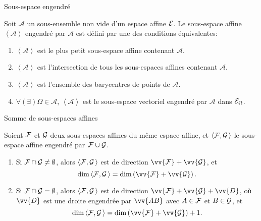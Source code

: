 \documentclass[
bigger]{m53beamer}
\begin{document}
  \begin{frame}{Sous-espace engendré}
    \begin{defprop}
      Soit $\mathcal{A}$ un sous-ensemble non vide d'un espace affine $\mathcal{E}$. Le sous-espace affine $\left<\mathcal{A}\right>$ engendré par $\mathcal{A}$ est défini par une des conditions équivalentes:
        \begin{enumerate}[<+(1)->]
          \item $\left<\mathcal{A}\right>$ est le plus petit sous-espace affine contenant $\mathcal{A}$.
          \item $\left<\mathcal{A}\right>$ est l'intersection de tous les sous-espaces affines contenant $\mathcal{A}$.
          \item $\left<\mathcal{A}\right>$ est l'ensemble des barycentres de points de $\mathcal{A}$.
          \item $\forall(\exists) \Omega \in \mathcal{A}$, $\left<\mathcal{A}\right>$ est le sous-espace vectoriel engendré par $\mathcal{A}$ dans $\mathcal{E}_{\Omega}$.
        \end{enumerate}
    \end{defprop}
  \end{frame}
  \begin{frame}{Somme de sous-espaces affines}
    \begin{proposition}
      Soient $\mathcal{F}$ et $\mathcal{G}$ deux sous-espaces affines du même espace affine, et $\left<\mathcal{F},\mathcal{G}\,\right>$ le sous-espace affine engendré par $\mathcal{F} \cup \mathcal{G}$.
      \begin{enumerate}[<+(1)->]
        \item Si $\mathcal{F} \cap \mathcal{G} \neq \emptyset$, alors $\left<\mathcal{F},\mathcal{G}\,\right>$ est de direction $\vv{\ens{F}}+\vv{\ens{G}}$\pause, et
            $$
              \dim\left<\ens{F},\ens{G}\,\right> = \dim \left(\vv{\ens{F}}+\vv{\ens{G}}\right).
            $$
        \item Si $\mathcal{F} \cap \mathcal{G} = \emptyset$, alors $\left<\mathcal{F},\mathcal{G}\,\right>$ est de direction $\vv{\ens{F}}+\vv{\ens{G}}+\vv{D}$, où $\vv{D}$ est une droite engendrée par $\vv{AB}$ avec $A \in \mathcal{F}$ et $B \in \mathcal{G}$\pause, et
            $$
              \dim\left<\ens{F},\ens{G}\,\right> = \dim \left(\vv{\ens{F}}+\vv{\ens{G}}\right)+1.
            $$
      \end{enumerate}
    \end{proposition}
  \end{frame}
\end{document}
